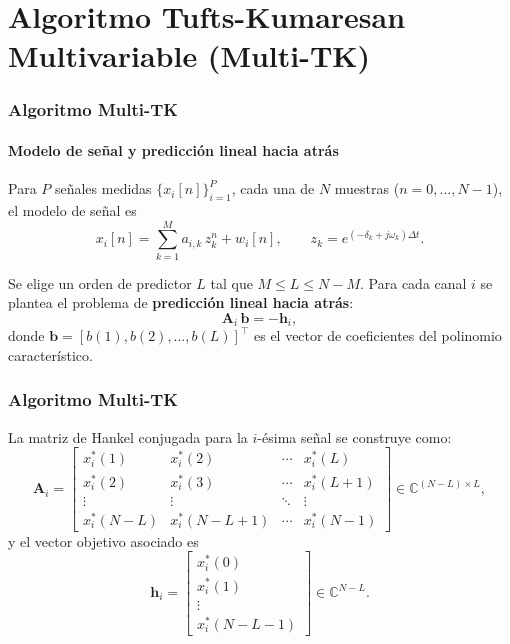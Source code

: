 \documentclass{beamer}
\begin{document}
\section{Algoritmo Tufts-Kumaresan Multivariable (Multi-TK)}

\begin{frame}
\frametitle{Algoritmo Multi-TK}
\framesubtitle{Modelo de señal y predicción lineal hacia atrás}

Para $P$ señales medidas $\{x_i[n]\}_{i=1}^P$, cada una de $N$ muestras ($n=0,\dots,N-1$), el modelo de señal es
\[
x_i[n] = \sum_{k=1}^{M} a_{i,k}\, z_k^n + w_i[n], \qquad z_k = e^{(-\delta_k + j\omega_k)\Delta t}.
\]

Se elige un orden de predictor $L$ tal que $M \le L \le N-M$. Para cada canal $i$ se plantea el problema de \textbf{predicción lineal hacia atrás}:
\begin{equation}
\mathbf{A}_i\,\mathbf{b} = -\mathbf{h}_i,
\label{eq:backward_pred}
\end{equation}
donde $\mathbf{b}=[b(1),b(2),\dots,b(L)]^\top$ es el vector de coeficientes del polinomio característico.
\end{frame}


\begin{frame}
\frametitle{Algoritmo Multi-TK}

La matriz de Hankel conjugada para la $i$-ésima señal se construye como:
\begin{equation}
\mathbf{A}_i =
\begin{bmatrix}
x_i^*(1)   & x_i^*(2)   & \cdots & x_i^*(L) \\
x_i^*(2)   & x_i^*(3)   & \cdots & x_i^*(L+1) \\
\vdots     & \vdots     & \ddots & \vdots   \\
x_i^*(N-L) & x_i^*(N-L+1) & \cdots & x_i^*(N-1)
\end{bmatrix}
\in \mathbb{C}^{(N-L)\times L},
\label{eq:Ai}
\end{equation}
y el vector objetivo asociado es
\begin{equation}
\mathbf{h}_i =
\begin{bmatrix}
x_i^*(0) \\ x_i^*(1) \\ \vdots \\ x_i^*(N-L-1)
\end{bmatrix}
\in \mathbb{C}^{N-L}.
\label{eq:hi}
\end{equation}
\end{frame}
\end{document}
